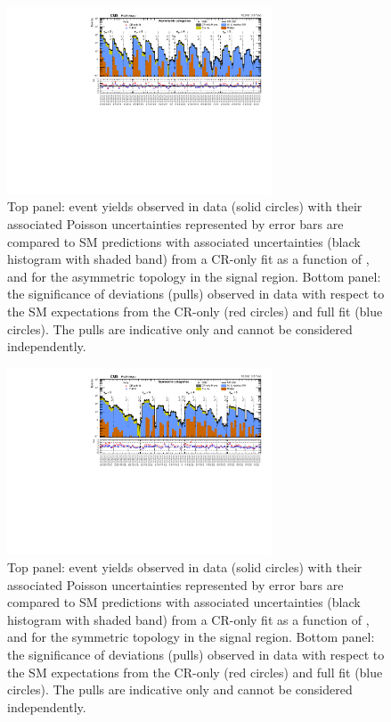 \begin{figure}[!h]
  \begin{center}
    \includegraphics[angle=90,width=0.7\textwidth]{Figures/statisticalResults/summaryPlot_Asymmetric_prefit_overlay_fit_b}
    \caption{Top panel: event yields observed in data (solid circles) 
	with their associated Poisson uncertainties represented by error bars 
	are compared to SM predictions with associated uncertainties (black
      histogram with shaded band) from a CR-only fit as a function of
      \njet, \nb and \scalht for the asymmetric topology in the
      signal region. Bottom panel: the significance of deviations
      (pulls) observed in data with respect to the SM expectations
      from the CR-only (red circles) and full fit (blue circles). The
      pulls are indicative only and cannot be considered
      independently.}
    \label{fig:asym}
  \end{center}
\end{figure}

\begin{figure}[!h]
  \begin{center}
    \includegraphics[angle=90,width=0.7\textwidth]{Figures/statisticalResults/summaryPlot_Symmetric_prefit_overlay_fit_b}
    \caption{Top panel: event yields observed in data (solid circles) 
	with their associated Poisson uncertainties represented by error bars 
	are compared to SM predictions with associated uncertainties (black
      histogram with shaded band) from a CR-only fit as a function of
      \njet, \nb and \scalht for the symmetric topology in the
      signal region. Bottom panel: the significance of deviations
      (pulls) observed in data with respect to the SM expectations
      from the CR-only (red circles) and full fit (blue circles). The
      pulls are indicative only and cannot be considered
      independently.}
    \label{fig:sym}
  \end{center}
\end{figure}

